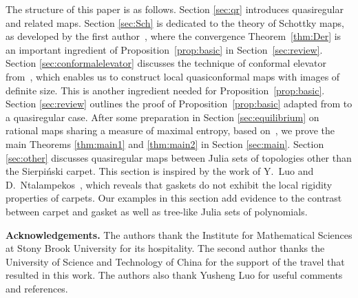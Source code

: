 \documentclass[12pt]{amsart}
\newcommand{\J}{\mathcal{J}}
\begin{document}
The structure of this paper is as follows. Section \ref{sec:qr} introduces  qua\-si\-re\-gu\-lar and related maps. Section \ref{sec:Sch} is dedicated to the theory of Schottky maps, as developed by the first author~\cite{Me1,Me2, Me3}, where the convergence Theorem~\ref{thm:Der} is an important ingredient of Proposition~\ref{prop:basic} in Section~\ref{sec:review}. 
Section \ref{sec:conformalelevator} discusses the technique of conformal elevator from~\cite[Section 4]{BLM}, which enables us to construct local quasiconformal maps with images of definite size. This is another ingredient needed for Proposition~\ref{prop:basic}. 
Section \ref{sec:review} outlines the proof of Proposition~\ref{prop:basic} adapted from \cite{BLM} to a quasiregular case.
After some preparation in Section \ref{sec:equilibrium} on rational maps sharing a measure of maximal entropy, based on~\cite{Le, Le2, LP, Ye}, we prove the main Theorems \ref{thm:main1} and \ref{thm:main2} in Section \ref{sec:main}. 
Section \ref{sec:other} discusses quasiregular maps between Julia sets of topologies other than the Sierpi\'nski carpet. This section is inspired by the work of Y.~Luo and D.~Ntalampekos~\cite{LN}, which reveals that gaskets do not exhibit the local rigidity properties of carpets. Our examples in this section add evidence to the contrast between carpet and gasket as well as tree-like Julia sets of polynomials.  

\medskip
\noindent
{\bf Acknowledgements.} The authors thank the Institute for Ma\-the\-ma\-ti\-cal Sciences at Stony Brook University for its hospitality.
The second author thanks the University of Science and Technology of China for the support of the travel that resulted in this work. The authors also thank Yusheng Luo for useful comments and references.


\end{document}
